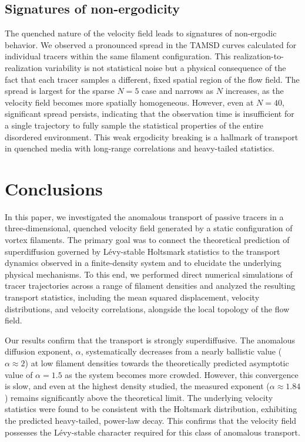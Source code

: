 \documentclass[]{article}
\begin{document}
\subsection{Signatures of non-ergodicity}

The quenched nature of the velocity field leads to signatures of non-ergodic behavior. We observed a pronounced spread in the TAMSD curves calculated for individual tracers within the same filament configuration. This realization-to-realization variability is not statistical noise but a physical consequence of the fact that each tracer samples a different, fixed spatial region of the flow field. The spread is largest for the sparse $N=5$ case and narrows as $N$ increases, as the velocity field becomes more spatially homogeneous. However, even at $N=40$, significant spread persists, indicating that the observation time is insufficient for a single trajectory to fully sample the statistical properties of the entire disordered environment. This weak ergodicity breaking is a hallmark of transport in quenched media with long-range correlations and heavy-tailed statistics.

\section{Conclusions}
\label{sec:conclusions}
In this paper, we investigated the anomalous transport of passive tracers in a three-dimensional, quenched velocity field generated by a static configuration of vortex filaments. The primary goal was to connect the theoretical prediction of superdiffusion governed by Lévy-stable Holtsmark statistics to the transport dynamics observed in a finite-density system and to elucidate the underlying physical mechanisms. To this end, we performed direct numerical simulations of tracer trajectories across a range of filament densities and analyzed the resulting transport statistics, including the mean squared displacement, velocity distributions, and velocity correlations, alongside the local topology of the flow field.

Our results confirm that the transport is strongly superdiffusive. The anomalous diffusion exponent, $\alpha$, systematically decreases from a nearly ballistic value ($\alpha \approx 2$) at low filament densities towards the theoretically predicted asymptotic value of $\alpha = 1.5$ as the system becomes more crowded. However, this convergence is slow, and even at the highest density studied, the measured exponent ($\alpha \approx 1.84$) remains significantly above the theoretical limit. The underlying velocity statistics were found to be consistent with the Holtsmark distribution, exhibiting the predicted heavy-tailed, power-law decay. This confirms that the velocity field possesses the Lévy-stable character required for this class of anomalous transport.
\end{document}
